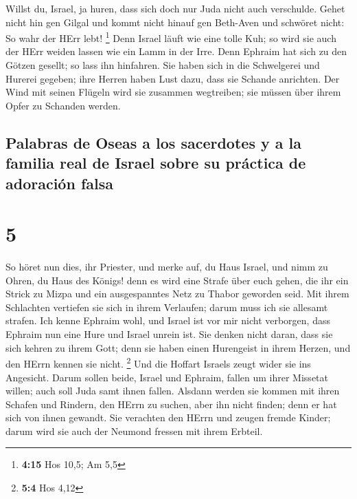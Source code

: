  Willst du, Israel, ja huren, dass sich doch nur Juda
nicht auch verschulde. Gehet nicht hin gen Gilgal und kommt nicht hinauf
gen Beth-Aven und schwöret nicht: So wahr der HErr lebt! \footnote{\textbf{4:15}
  Hos 10,5; Am 5,5}  Denn Israel läuft wie eine tolle
Kuh; so wird sie auch der HErr weiden lassen wie ein Lamm in der Irre.
 Denn Ephraim hat sich zu den Götzen gesellt; so lass ihn
hinfahren.  Sie haben sich in die Schwelgerei und Hurerei
gegeben; ihre Herren haben Lust dazu, dass sie Schande anrichten.
 Der Wind mit seinen Flügeln wird sie zusammen
wegtreiben; sie müssen über ihrem Opfer zu Schanden werden.

\hypertarget{palabras-de-oseas-a-los-sacerdotes-y-a-la-familia-real-de-israel-sobre-su-pruxe1ctica-de-adoraciuxf3n-falsa}{%
\subsection{Palabras de Oseas a los sacerdotes y a la familia real de
Israel sobre su práctica de adoración
falsa}\label{palabras-de-oseas-a-los-sacerdotes-y-a-la-familia-real-de-israel-sobre-su-pruxe1ctica-de-adoraciuxf3n-falsa}}

\hypertarget{section-4}{%
\section{5}\label{section-4}}

 So höret nun dies, ihr Priester, und merke auf, du Haus
Israel, und nimm zu Ohren, du Haus des Königs! denn es wird eine Strafe
über euch gehen, die ihr ein Strick zu Mizpa und ein ausgespanntes Netz
zu Thabor geworden seid.  Mit ihrem Schlachten vertiefen
sie sich in ihrem Verlaufen; darum muss ich sie allesamt strafen.
 Ich kenne Ephraim wohl, und Israel ist vor mir nicht
verborgen, dass Ephraim nun eine Hure und Israel unrein ist.
 Sie denken nicht daran, dass sie sich kehren zu ihrem
Gott; denn sie haben einen Hurengeist in ihrem Herzen, und den HErrn
kennen sie nicht. \footnote{\textbf{5:4} Hos 4,12}  Und
die Hoffart Israels zeugt wider sie ins Angesicht. Darum sollen beide,
Israel und Ephraim, fallen um ihrer Missetat willen; auch soll Juda samt
ihnen fallen.  Alsdann werden sie kommen mit ihren Schafen
und Rindern, den HErrn zu suchen, aber ihn nicht finden; denn er hat
sich von ihnen gewandt.  Sie verachten den HErrn und
zeugen fremde Kinder; darum wird sie auch der Neumond fressen mit ihrem
Erbteil.

